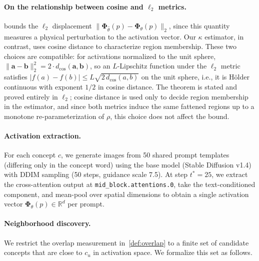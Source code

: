 \paragraph{On the relationship between cosine and $\ell_2$ metrics.}
 bounds the $\ell_2$ displacement $\|\boldsymbol{\Phi}_{\hat\theta}(p) - \boldsymbol{\Phi}_{\theta}(p)\|_2$, since this quantity measures a physical perturbation to the activation vector. Our $\kappa$ estimator, in contrast, uses cosine distance to characterize region membership. These two choices are compatible: for activations normalized to the unit sphere, $\|\mathbf{a} - \mathbf{b}\|_2^2 = 2 \cdot d_{\cos}(\mathbf{a}, \mathbf{b})$, so an $L$-Lipschitz function under the $\ell_2$ metric satisfies $|f(a)-f(b)|\le L\sqrt{2\,d_{\cos}(a,b)}$ on the unit sphere, i.e., it is H\"older continuous with exponent $1/2$ in cosine distance. The theorem is stated and proved entirely in $\ell_2$; cosine distance is used only to decide region membership in the estimator, and since both metrics induce the same fattened regions up to a monotone re-parameterization of $\rho$, this choice does not affect the bound. 

\paragraph{Activation extraction.}
For each concept $c$, we generate images from 50 shared prompt templates (differing only in the concept word) using the base model (Stable Diffusion v1.4) with DDIM sampling (50 steps, guidance scale 7.5). At step $t^*{=}25$, we extract the cross-attention output at \texttt{mid\_block.attentions.0}, take the text-conditioned component, and mean-pool over spatial dimensions to obtain a single activation vector $\boldsymbol{\Phi}_\theta(p) \in \mathbb{R}^d$ per prompt. 


\paragraph{Neighborhood discovery.}
We restrict the overlap measurement in~\cref{def:overlap} to a finite set of candidate concepts that are close to $c_u$ in activation space. We formalize this set as follows.


